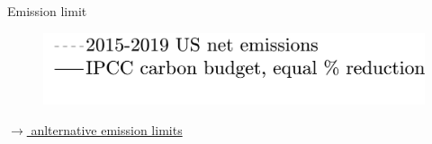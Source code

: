 \documentclass[11pt,aspectratio=169]{beamer}
\begin{document}
\begin{frame}{Emission limit}
\begin{center}
\begin{minipage}{0.6\textwidth}
\begin{figure}
			\end{figure}
		\end{minipage}
		\hspace{-10mm}
		\begin{minipage}{0.3\textwidth}
			\begin{figure}
				\includegraphics[width=1.4\textwidth]{../codding_model/own_basedOnFried/optimalPol_010922_revision/figures/all_13Sept22_Tplus30/Emnet_goals_o0_lgd1_crop.png}
			\end{figure}
		\end{minipage}
	\end{center}

\vspace{-6.5mm}
\hfill \hyperlink{altems}{\tiny{$\rightarrow$ anlternative emission limits}}
\end{frame}
\end{document}
